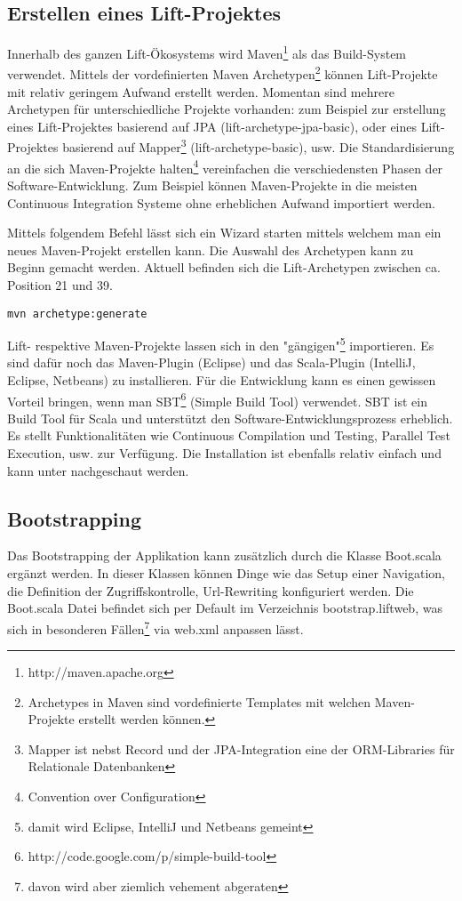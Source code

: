 \subsection{Erstellen eines Lift-Projektes}\label{lift:create}
Innerhalb des ganzen Lift-\"Okosystems wird Maven\footnote{http://maven.apache.org} als das Build-System verwendet. Mittels der vordefinierten Maven Archetypen\footnote{Archetypes in Maven sind vordefinierte Templates mit welchen Maven-Projekte erstellt werden k\"onnen.} k\"onnen Lift-Projekte mit relativ geringem Aufwand erstellt werden. Momentan sind mehrere Archetypen f\"ur unterschiedliche Projekte vorhanden: zum Beispiel zur erstellung eines Lift-Projektes basierend auf JPA (lift-archetype-jpa-basic), oder eines Lift-Projektes basierend auf Mapper\footnote{Mapper ist nebst Record und der JPA-Integration eine der ORM-Libraries f\"ur Relationale Datenbanken} (lift-archetype-basic), usw.  Die Standardisierung an die sich Maven-Projekte halten\footnote{Convention over Configuration} vereinfachen die verschiedensten Phasen der Software-Entwicklung. Zum Beispiel k\"onnen Maven-Projekte in die meisten Continuous Integration Systeme ohne erheblichen Aufwand importiert werden.

Mittels folgendem Befehl l\"asst sich ein Wizard starten mittels welchem man ein neues Maven-Projekt erstellen kann. Die Auswahl des Archetypen kann zu Beginn gemacht werden. Aktuell befinden sich die Lift-Archetypen zwischen ca. Position 21 und 39.
\begin{lstlisting}[caption=Erstellung eines Lift-Projektes]
mvn archetype:generate
\end{lstlisting}

Lift- respektive Maven-Projekte lassen sich in den "g\"angigen"\footnote{damit wird Eclipse, IntelliJ und Netbeans gemeint} importieren. Es sind daf\"ur noch das Maven-Plugin (Eclipse) und das Scala-Plugin (IntelliJ, Eclipse, Netbeans) zu installieren. F\"ur die Entwicklung kann es einen gewissen Vorteil bringen, wenn man SBT\footnote{http://code.google.com/p/simple-build-tool} (Simple Build Tool) verwendet. SBT ist ein Build Tool f\"ur Scala und unterst\"utzt den Software-Entwicklungsprozess erheblich. Es stellt Funktionalit\"aten wie Continuous Compilation und Testing, Parallel Test Execution, usw. zur Verf\"ugung. Die Installation ist ebenfalls relativ einfach und kann unter \cite{liftweb:using-sbt} nachgeschaut werden.

\subsection{Bootstrapping \cite[p. 26]{chen2009lift}}
Das Bootstrapping der Applikation kann zus\"atzlich durch die Klasse Boot.scala erg\"anzt werden. In dieser Klassen k\"onnen Dinge wie das Setup einer Navigation, die Definition der Zugriffskontrolle, Url-Rewriting konfiguriert werden. Die Boot.scala Datei befindet sich per Default im Verzeichnis bootstrap.liftweb, was sich in besonderen F\"allen\footnote{davon wird aber ziemlich vehement abgeraten} via web.xml anpassen l\"asst.

